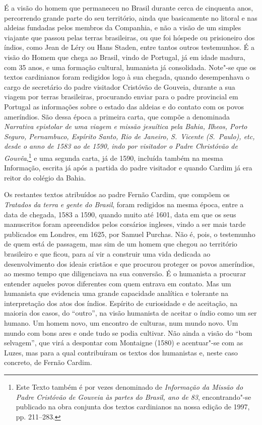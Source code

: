 É a visão do homem que permaneceu no Brasil durante cerca de
cinquenta anos, percorrendo grande parte do seu território, ainda que
basicamente no litoral e nas aldeias fundadas pelos membros da
Companhia, e não a visão de um simples viajante que passou pelas
terras brasileiras, ou que foi hóspede ou prisioneiro dos índios, como
Jean de Léry ou Hans Staden, entre tantos outros testemunhos. É a visão 
do Homem que chega ao Brasil, vindo de Portugal, já em idade
madura, com 35 anos, e uma formação cultural, humanista já
consolidada. Note"-se que os textos cardinianos foram redigidos logo à
sua chegada, quando desempenhava o cargo de secretário do padre
visitador Cristóvão de Gouveia, durante a sua viagem por terras
brasileiras, procurando enviar para o padre provincial em Portugal as
informações sobre o estado das aldeias e do contato com os povos
ameríndios. São dessa época a primeira carta, que compõe a denominada
\textit{Narrativa epistolar de uma viagem e missão
jesuítica pela Bahia, Ilheos, Porto Seguro, Pernambuco, Espírito Santo,
Rio de Janeiro, S.~Vicente (S.~Paulo), etc, desde o anno de 1583 ao de
1590, indo por visitador o Padre Christóvão de Gouvêa},\footnote{ Este Texto também
é por vezes denominado de \textit{Informação da Missão do Padre
Cristóvão de Gouveia às partes do Brasil, ano de 83}, encontrando"-se
publicado na obra conjunta dos textos cardinianos na nossa edição de 1997, 
pp. 211--283.} e uma segunda carta, já de 1590, incluída
também na mesma Informação, escrita já após a partida do padre
visitador e quando Cardim já era reitor do colégio da Bahia.

Os restantes textos atribuídos ao padre Fernão Cardim, que compõem os
\textit{Tratados da terra e gente do Brasil}, foram redigidos na mesma
época, entre a data de chegada, 1583 a 1590, quando muito até 1601,
data em que os seus manuscritos foram apreendidos pelos corsários
ingleses, vindo a ser mais tarde publicados em Londres, em 1625, por
Samuel Purchas. Não é, pois, o testemunho de quem está de passagem, mas
sim de um homem que chegou ao território brasileiro e que ficou, para
aí vir a construir uma vida dedicada ao desenvolvimento dos ideais
cristãos e que procurou proteger os povos ameríndios, ao mesmo tempo
que diligenciava na sua conversão. 
É o humanista a procurar entender aqueles povos diferentes com quem
entrava em contato. Mas um humanista que evidencia uma grande
capacidade analítica e tolerante na interpretação dos atos dos índios.
Espírito de curiosidade e de aceitação, na maioria dos casos, do
``outro'', na visão humanista de aceitar o índio como um ser humano. Um
homem novo, um encontro de culturas, num mundo novo. Um mundo com bons
ares e onde tudo se podia cultivar. Não ainda a visão do ``bom
selvagem'', que virá a despontar com Montaigne (1580) e acentuar"-se com
as Luzes, mas para a qual contribuíram os textos dos humanistas e, neste
caso concreto, de Fernão Cardim.

